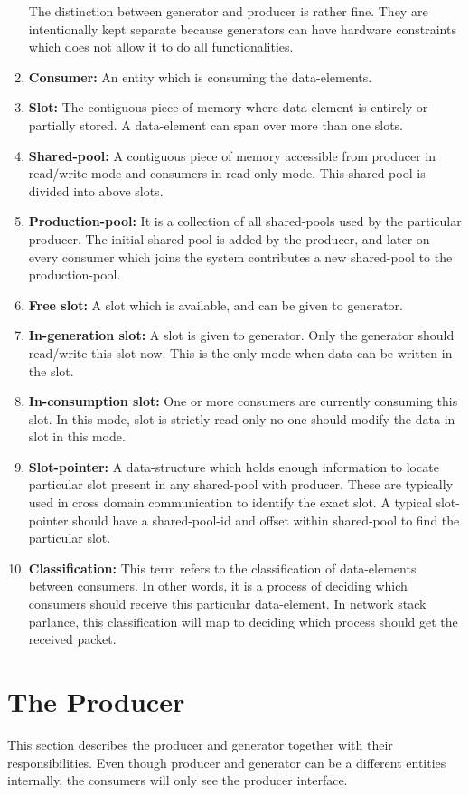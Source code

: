 \documentclass[a4paper,twoside]{report} %
\begin{document}
\begin{enumerate}
  The distinction between generator and producer is
  rather fine.  They are intentionally kept separate because
  generators can have hardware constraints which does not allow
  it to do all functionalities.
  \item \textbf{Consumer:} An entity which is consuming the data-elements. 
  \item \textbf{Slot:} The contiguous piece of memory where data-element is
  entirely or partially stored. A data-element can span over
  more than one slots. 
  \item \textbf{Shared-pool:} A contiguous piece of memory accessible 
   from producer in read/write mode and consumers in read only mode.
   This shared pool is divided into above slots.
  \item \textbf{Production-pool:} It is a collection of all
  shared-pools used by the particular producer.  The initial
  shared-pool is added by the producer, and later on every consumer
  which joins the system contributes a new shared-pool to the
  production-pool.
  \item \textbf{Free slot:} A slot which is available, and can be given
  to generator.
  \item \textbf{In-generation slot:} A slot is given to generator. Only 
  the generator should read/write this slot now.  This is the only
  mode when data can be written in the slot.
  \item \textbf{In-consumption slot:} One or more consumers are currently
  consuming this slot.  In this mode, slot is strictly read-only
  no one should modify the data in slot in this mode.
  \item \textbf{Slot-pointer:} A data-structure which holds enough
  information to locate particular slot present in any shared-pool
  with producer.  These are typically used in cross domain
  communication to identify the exact slot.  A typical slot-pointer
  should have a shared-pool-id and offset within shared-pool to
  find the particular slot.
  \item \textbf{Classification:} This term refers to the
  classification of data-elements between consumers.  In other words,
  it is a process of deciding which consumers should receive this
  particular data-element.  In network stack parlance, this
  classification will map to deciding which process should get the
  received packet.
\end{enumerate}

\section{The Producer}
This section describes the producer and generator together with
their responsibilities.  Even though producer and generator can
be a different entities internally, the consumers will only see
the producer interface.
\end{document}
